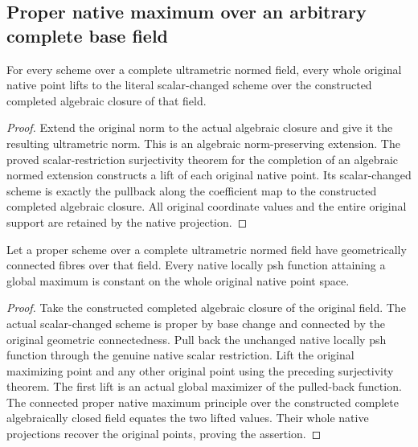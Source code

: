 \subsection{Proper native maximum over an arbitrary complete base field}

\begin{lemma}
\label{lem:fc-native-complete-algebraic-closure-surjective}
\leanok
For every scheme over a complete ultrametric normed field, every whole
original native point lifts to the literal scalar-changed scheme over the
constructed completed algebraic closure of that field.
\end{lemma}
\begin{proof}
Extend the original norm to the actual algebraic closure and give it the
resulting ultrametric norm. This is an algebraic norm-preserving extension.
The proved scalar-restriction surjectivity theorem for the completion of an
algebraic normed extension constructs a lift of each original native point.
Its scalar-changed scheme is exactly the pullback along the coefficient map
to the constructed completed algebraic closure. All original coordinate
values and the entire original support are retained by the native projection.
\end{proof}

\begin{theorem}
\label{thm:fc-geometrically-connected-proper-native-maximum}
\leanok
Let a proper scheme over a complete ultrametric normed field have geometrically
connected fibres over that field. Every native locally psh function attaining
a global maximum is constant on the whole original native point space.
\end{theorem}
\begin{proof}
Take the constructed completed algebraic closure of the original field.
The actual scalar-changed scheme is proper by base change and connected by
the original geometric connectedness. Pull back the unchanged native locally
psh function through the genuine native scalar restriction. Lift the original
maximizing point and any other original point using the preceding surjectivity
theorem. The first lift is an actual global maximizer of the pulled-back
function. The connected proper native maximum principle over the constructed
complete algebraically closed field equates the two lifted values. Their
whole native projections recover the original points, proving the assertion.
\end{proof}
